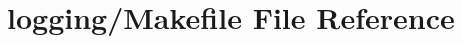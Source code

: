 \hypertarget{logging_2Makefile}{\section{logging/\-Makefile File Reference}
\label{logging_2Makefile}
}
